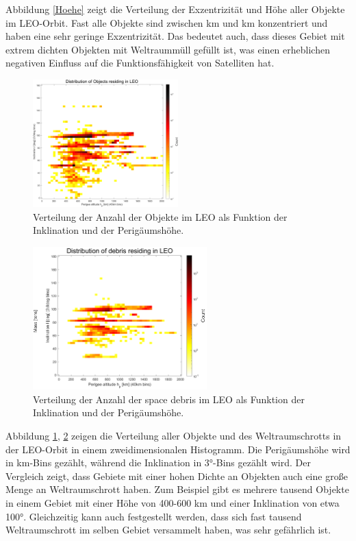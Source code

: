 Abbildung \ref{Hoehe} zeigt die Verteilung der Exzentrizität und Höhe aller Objekte im LEO-Orbit. Fast alle Objekte sind zwischen \unit[200]{km} und \unit[1600]{km} konzentriert und haben eine sehr geringe Exzentrizität. Das bedeutet auch, dass dieses Gebiet mit extrem dichten Objekten mit Weltraummüll gefüllt ist, was einen erheblichen negativen Einfluss auf die Funktionsfähigkeit von Satelliten hat.
\clearpage
\begin{figure}[htbp]
	\centering
	\includegraphics[width=0.5\textwidth]{bilder/Distribution_1.png}
	\caption{Verteilung der Anzahl der Objekte im LEO als Funktion der Inklination und der Perigäumshöhe.}
	\label{Distribution_1}
\end{figure}

\begin{figure}[htbp]
	\centering
	\includegraphics[width=0.6\textwidth]{bilder/Distribution_2.png}
	\caption{Verteilung der Anzahl der space debris im LEO als Funktion der Inklination und der Perigäumshöhe.}
	\label{Distribution_2}
\end{figure}
Abbildung \ref{Distribution_1}, \ref{Distribution_2} zeigen die Verteilung aller Objekte und des Weltraumschrotts in der LEO-Orbit in einem zweidimensionalen Histogramm. Die Perigäumshöhe wird in \unit[40]{km}-Bins gezählt, während die Inklination in 3°-Bins gezählt wird. Der Vergleich zeigt, dass Gebiete mit einer hohen Dichte an Objekten auch eine große Menge an Weltraumschrott haben. Zum Beispiel gibt es mehrere tausend Objekte in einem Gebiet mit einer Höhe von 400-600 km und einer Inklination von etwa 100°. Gleichzeitig kann auch festgestellt werden, dass sich fast tausend Weltraumschrott im selben Gebiet versammelt haben, was sehr gefährlich ist.
